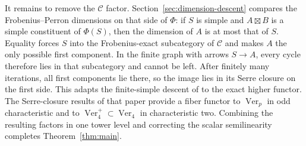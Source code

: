 It remains to remove the $\mathcal C$ factor.
Section~\ref{sec:dimension-descent} compares the Frobenius--Perron
dimensions on that side of $\Phi$: if $S$ is simple and
$A\boxtimes B$ is a simple constituent of $\Phi(S)$, then the dimension
of $A$ is at most that of $S$. Equality forces $S$ into the
Frobenius-exact subcategory of $\mathcal C$ and makes $A$ the only
possible first component. In the finite graph with arrows $S\to A$,
every cycle therefore lies in that subcategory and cannot be left.
After finitely many iterations, all first components lie there, so
the image lies in its Serre closure on the first side. This adapts the finite-simple descent of
\cite[Section~10]{EtingofOstrikFrobenius} to the exact higher functor.
The Serre-closure results of that paper provide a fiber functor to
$\operatorname{Ver}_p$ in odd characteristic and to
$\operatorname{Ver}_4^+\subset\operatorname{Ver}_4$ in characteristic two.
Combining the resulting factors in one tower level and correcting the
scalar semilinearity completes Theorem~\ref{thm:main}.
